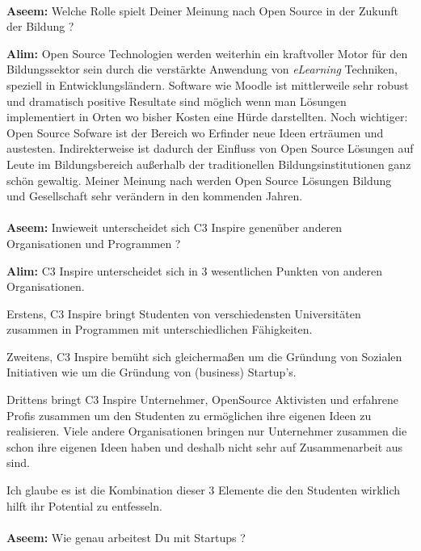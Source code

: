 \paragraph{}
\textbf{Aseem:} Welche Rolle spielt Deiner Meinung nach Open Source in der 
Zukunft der Bildung ?

\textbf{Alim:} Open Source Technologien werden weiterhin ein kraftvoller Motor 
für den Bildungssektor sein durch die verstärkte Anwendung von 
\textit{eLearning} Techniken, speziell in Entwicklungsländern. Software wie 
Moodle ist mittlerweile sehr robust und dramatisch positive Resultate 
sind möglich wenn man Lösungen implementiert in Orten wo bisher 
Kosten eine Hürde darstellten. Noch wichtiger: Open Source Sofware ist 
der Bereich wo Erfinder neue Ideen erträumen und austesten. 
Indirekterweise ist dadurch der Einfluss von Open Source Lösungen auf 
Leute im Bildungsbereich außerhalb der traditionellen 
Bildungsinstitutionen ganz schön gewaltig. Meiner Meinung nach werden 
Open Source Lösungen Bildung und Gesellschaft sehr verändern in den 
kommenden Jahren.

\paragraph{}
\textbf{Aseem:} Inwieweit unterscheidet sich C3 Inspire genenüber anderen 
Organisationen und Programmen ?

\textbf{Alim:} C3 Inspire unterscheidet sich in 3 wesentlichen Punkten von 
anderen Organisationen. 

Erstens, C3 Inspire bringt Studenten von 
verschiedensten Universitäten zusammen in Programmen mit 
unterschiedlichen Fähigkeiten. 

Zweitens, C3 Inspire bemüht sich gleichermaßen um die Gründung von 
Sozialen Initiativen wie um die Gründung von (business) Startup's. 

Drittens bringt C3 Inspire Unternehmer, OpenSource Aktivisten und 
erfahrene Profis zusammen um den Studenten zu ermöglichen ihre eigenen 
Ideen zu realisieren. Viele andere Organisationen bringen nur 
Unternehmer zusammen die schon ihre eigenen Ideen haben und deshalb 
nicht sehr auf Zusammenarbeit aus sind. 

Ich glaube es ist die Kombination dieser 3 Elemente die den Studenten 
wirklich hilft ihr Potential zu entfesseln.

\paragraph{}
\textbf{Aseem:} Wie genau arbeitest Du mit Startups ?

